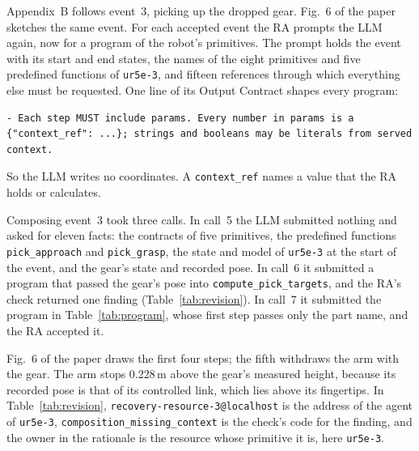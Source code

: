 \documentclass[preprint,12pt,authoryear]{elsarticle}
\newcommand{\FigComposition}{Fig.~6}
\let\code\nolinkurl
\begin{document}
Appendix~B follows event~3, picking up the dropped gear. \FigComposition{} of the paper sketches
the same event. For each accepted event the RA prompts the LLM again, now for a program of the
robot's primitives. The prompt holds the event with its start and end states, the names of the
eight primitives and five predefined functions of \code{ur5e-3}, and fifteen references through
which everything else must be requested. One line of its Output Contract shapes every program:

\begin{lstlisting}[style=quoteline]
- Each step MUST include params. Every number in params is a {"context_ref": ...}; strings and booleans may be literals from served context.
\end{lstlisting}

So the LLM writes no coordinates. A \code{context_ref} names a value that the RA holds or
calculates.

Composing event~3 took three calls. In call~5 the LLM submitted nothing and asked for eleven
facts: the contracts of five primitives, the predefined functions \code{pick_approach} and
\code{pick_grasp}, the state and model of \code{ur5e-3} at the start of the event, and the
gear's state and recorded pose. In call~6 it submitted a program that passed the gear's pose
into \code{compute_pick_targets}, and the RA's check returned one finding
(Table~\ref{tab:revision}). In call~7 it submitted the program in Table~\ref{tab:program},
whose first step passes only the part name, and the RA accepted it.

\FigComposition{} of the paper draws the first four steps; the fifth withdraws the arm with the
gear. The arm stops 0.228\,m above the gear's measured height, because its recorded pose is that
of its controlled link, which lies above its fingertips. In Table~\ref{tab:revision},
\code{recovery-resource-3@localhost} is the address of the agent of \code{ur5e-3},
\code{composition_missing_context} is the check's code for the finding, and the owner in the
rationale is the resource whose primitive it is, here \code{ur5e-3}.
\end{document}
